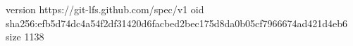 version https://git-lfs.github.com/spec/v1
oid sha256:efb5d74dc4a54f2df31420d6facbed2bec175d8da0b05cf7966674ad421d4eb6
size 1138
